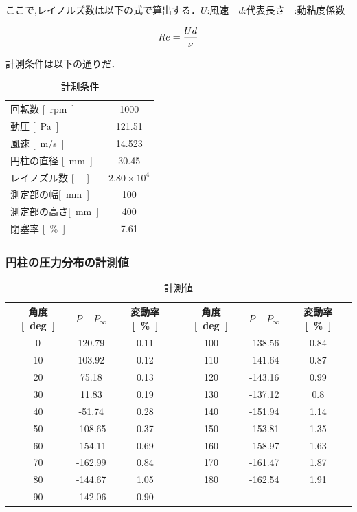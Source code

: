 \documentclass[a4paper,titlepage]{ltjsarticle}
\begin{document}
ここで,レイノルズ数は以下の式で算出する．$U$:風速　$d$:代表長さ　\nu :動粘度係数

\begin{equation}
  Re=\frac{Ud}{\nu }\\
  \end{equation}

  計測条件は以下の通りだ．
\begin{table}[hbtp]
  \caption{計測条件}
  \centering
  \begin{tabular}{lc}
    \toprule
    回転数 {\si{[rpm]}}& 1000 \\
    動圧 {\si{[Pa]}} & 121.51\\
  風速 {\si{[m/s]}} & 14.523\\
  円柱の直径 {\si{[mm]}} & 30.45\\
  レイノズル数 {\si{[-]}} & $2.80\times 10^4$\\
  測定部の幅{\si{[mm]}} & 100\\
 測定部の高さ{\si{[mm]}}& 400\\
 閉塞率 {\si{[\%]}} & 7.61\\
 \bottomrule
  \end{tabular}
\end{table}

\clearpage

\subsubsection{円柱の圧力分布の計測値}
\begin{table}[hbtp]
  \caption{計測値}
  \centering
  \begin{tabular}{cccccc}
    \toprule
    角度 {\si{[deg]}}& $P-P_{\infty}$ & 変動率 {\si{[\%]}} & 角度 {\si{[deg]}}& $P-P_{\infty}$ & 変動率 {\si{[\%]}}\\
   \hline
    0 & 120.79 & 0.11 & 100 & -138.56 & 0.84\\
   10 & 103.92 & 0.12 & 110 & -141.64 & 0.87\\
   20 & 75.18 & 0.13 & 120 & -143.16 & 0.99\\
   30 & 11.83 & 0.19 & 130 & -137.12 & 0.8\\
   40 & -51.74 & 0.28 & 140 & -151.94 & 1.14\\
   50 & -108.65 & 0.37 & 150 & -153.81 & 1.35\\
   60 & -154.11 & 0.69 & 160 & -158.97 & 1.63\\
   70 & -162.99 & 0.84 & 170 & -161.47 & 1.87\\
   80 & -144.67 & 1.05 & 180 & -162.54 & 1.91\\
   90 & -142.06 & 0.90&  & &\\
 \bottomrule
  \end{tabular}
\end{table}
\end{document}
